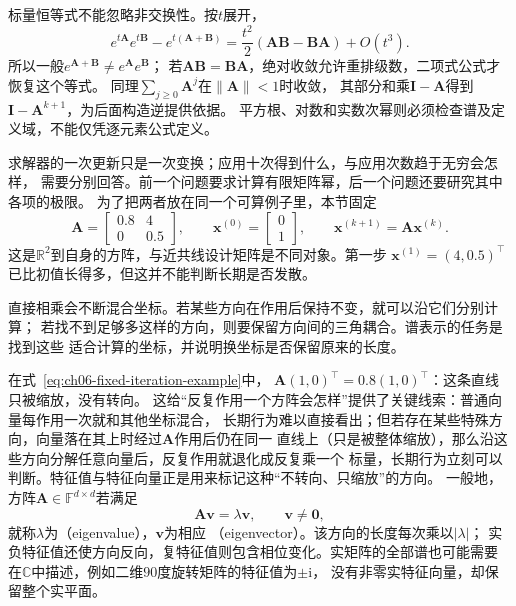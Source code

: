 标量恒等式不能忽略非交换性。按$t$展开，
\[
 e^{t\bm A}e^{t\bm B}-e^{t(\bm A+\bm B)}
 =\frac{t^2}{2}(\bm A\bm B-\bm B\bm A)+O(t^3).
\]
所以一般$e^{\bm A+\bm B}\neq e^{\bm A}e^{\bm B}$；
若$\bm A\bm B=\bm B\bm A$，绝对收敛允许重排级数，二项式公式才恢复这个等式。
同理$\sum_{j\geq0}\bm A^j$在$\lVert\bm A\rVert<1$时收敛，
其部分和乘$\bm I-\bm A$得到$\bm I-\bm A^{k+1}$，为后面构造逆提供依据。
平方根、对数和实数次幂则必须检查谱及定义域，不能仅凭逐元素公式定义。


求解器的一次更新只是一次变换；应用十次得到什么，与应用次数趋于无穷会怎样，
需要分别回答。前一个问题要求计算有限矩阵幂，后一个问题还要研究其中各项的极限。
为了把两者放在同一个可算例子里，本节固定
\begin{equation}
 \bm A=\begin{bmatrix}0.8&4\\0&0.5\end{bmatrix},
 \qquad
 \bm x^{(0)}=\begin{bmatrix}0\\1\end{bmatrix},
 \qquad \bm x^{(k+1)}=\bm A\bm x^{(k)}.
 \label{eq:ch06-fixed-iteration-example}
\end{equation}
这是$\mathbb R^2$到自身的方阵，与近共线设计矩阵是不同对象。第一步
$\bm x^{(1)}=(4,0.5)^\top$已比初值长得多，但这并不能判断长期是否发散。


直接相乘会不断混合坐标。若某些方向在作用后保持不变，就可以沿它们分别计算；
若找不到足够多这样的方向，则要保留方向间的三角耦合。谱表示的任务是找到这些
适合计算的坐标，并说明换坐标是否保留原来的长度。


在式~\eqref{eq:ch06-fixed-iteration-example}中，
$\bm A(1,0)^\top=0.8(1,0)^\top$：这条直线只被缩放，没有转向。
这给“反复作用一个方阵会怎样”提供了关键线索：普通向量每作用一次就和其他坐标混合，
长期行为难以直接看出；但若存在某些特殊方向，向量落在其上时经过$\bm A$作用后仍在同一
直线上（只是被整体缩放），那么沿这些方向分解任意向量后，反复作用就退化成反复乘一个
标量，长期行为立刻可以判断。特征值与特征向量正是用来标记这种“不转向、只缩放”的方向。
一般地，方阵$\bm A\in\mathbb F^{d\times d}$若满足
\begin{equation}
 \bm A\bm v=\lambda\bm v,\qquad \bm v\neq\bm0,
 \label{eq:matrix-analysis-eigenpair}
\end{equation}
就称$\lambda$为（eigenvalue），$\bm v$为相应
（eigenvector）。该方向的长度每次乘以$|\lambda|$；
实负特征值还使方向反向，复特征值则包含相位变化。实矩阵的全部谱也可能需要
在$\mathbb C$中描述，例如二维$90$度旋转矩阵的特征值为$\pm\mathrm i$，
没有非零实特征向量，却保留整个实平面。

